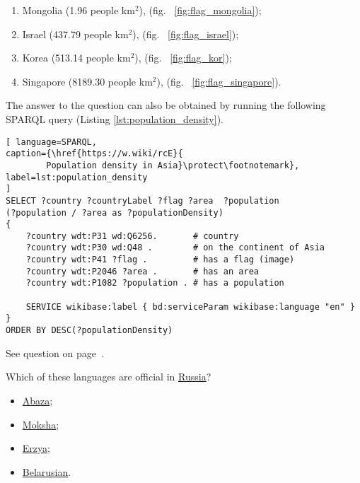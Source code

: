 \begin{enumerate}
\item Mongolia (\num{1.96} people km\begin{math}^2\end{math}), (fig. ~\ref{fig:flag_mongolia});
\item Israel (\num{437.79} people km\begin{math}^2\end{math}), (fig. ~\ref{fig:flag_israel});
\item Korea (\num{513.14} people km\begin{math}^2\end{math}), (fig. ~\ref{fig:flag_kor});
\item Singapore (\num{8189.30} people km\begin{math}^2\end{math}), (fig. ~\ref{fig:flag_singapore}).
\end{enumerate}

The answer to the question can also be obtained by running the following SPARQL query (Listing \ref{lst:population_density}).

\begin{lstlisting}[ language=SPARQL, 
caption={\href{https://w.wiki/rcE}{
		Population density in Asia}\protect\footnotemark},
label=lst:population_density
]
SELECT ?country ?countryLabel ?flag ?area  ?population 
(?population / ?area as ?populationDensity)
{
	?country wdt:P31 wd:Q6256.       # country
	?country wdt:P30 wd:Q48 .        # on the continent of Asia
	?country wdt:P41 ?flag .         # has a flag (image)
	?country wdt:P2046 ?area .       # has an area
	?country wdt:P1082 ?population . # has a population
	
	SERVICE wikibase:label { bd:serviceParam wikibase:language "en" }
}
ORDER BY DESC(?populationDensity)
\end{lstlisting}

See question on page~\pageref{question:population_density}.
\begin{exercise}
\label{answer:official_languages}
Which of these languages are official in \href{https://en.wikipedia.org/wiki/Russia}{Russia}?
\begin{itemize}
\item \href{https://en.wikipedia.org/wiki/Abaza_language}{Abaza};
\item \href{https://en.wikipedia.org/wiki/Moksha_language}{Moksha};
\item \href{https://en.wikipedia.org/wiki/Erzya_language}{Erzya};
\item \href{https://en.wikipedia.org/wiki/Belarusian_language}{Belarusian}.
\end{itemize}
\end{exercise}

